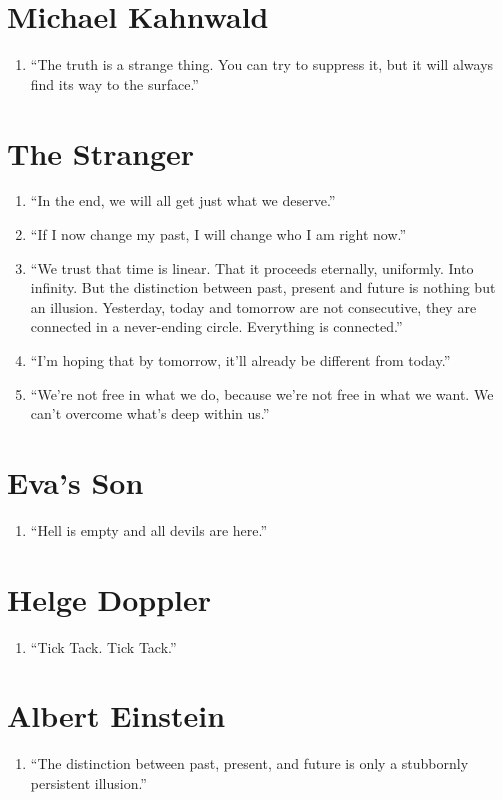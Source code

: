 \documentclass{book}
\numberwithin{equation}{section}
\begin{document}
\section{Michael Kahnwald}
\begin{enumerate}
    \item ``The truth is a strange thing. You can try to suppress it, but it will always find its way to the surface.''
\end{enumerate}

\section{The Stranger}
\begin{enumerate}
    \item ``In the end, we will all get just what we deserve.''
    \item ``If I now change my past, I will change who I am right now.''
    \item ``We trust that time is linear. That it proceeds eternally, uniformly. Into infinity. But the distinction between past, present and future is nothing but an illusion. Yesterday, today and tomorrow are not consecutive, they are connected in a never-ending circle. Everything is connected.''
    \item ``I'm hoping that by tomorrow, it'll already be different from today.''
    \item ``We're not free in what we do, because we're not free in what we want. We can't overcome what's deep within us.''
\end{enumerate}

\section{Eva's Son}
\begin{enumerate}
    \item ``Hell is empty and all devils are here.''
\end{enumerate}

\section{Helge Doppler}
\begin{enumerate}
    \item ``Tick Tack. Tick Tack.''
\end{enumerate}

\section{Albert Einstein}
\begin{enumerate}
    \item ``The distinction between past, present, and future is only a stubbornly persistent illusion.''
\end{enumerate}
\end{document}
